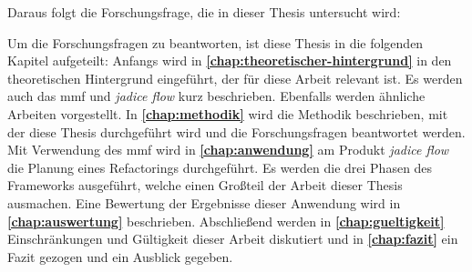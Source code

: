 Daraus folgt die Forschungsfrage, die in dieser Thesis untersucht wird:


%

Um die Forschungsfragen zu beantworten, ist diese Thesis in die folgenden Kapitel aufgeteilt:
Anfangs wird in \textbf{\cref{chap:theoretischer-hintergrund}} in den theoretischen Hintergrund eingeführt, der für diese Arbeit relevant ist. 
Es werden auch das \gls{mmf} und \emph{jadice flow} kurz beschrieben. 
Ebenfalls werden ähnliche Arbeiten vorgestellt.
In \textbf{\cref{chap:methodik}} wird die Methodik beschrieben, mit der diese Thesis durchgeführt wird und die Forschungsfragen beantwortet werden.
Mit Verwendung des \gls{mmf} wird in \textbf{\cref{chap:anwendung}} am Produkt \emph{jadice flow} die Planung eines Refactorings durchgeführt. 
Es werden die drei Phasen des Frameworks ausgeführt, welche einen Großteil der Arbeit dieser Thesis ausmachen. 
Eine Bewertung der Ergebnisse dieser Anwendung wird in \textbf{\cref{chap:auswertung}} beschrieben.
Abschließend werden in \textbf{\cref{chap:gueltigkeit}} Einschränkungen und Gültigkeit dieser Arbeit diskutiert und in \textbf{\cref{chap:fazit}} ein Fazit gezogen und ein Ausblick gegeben.  